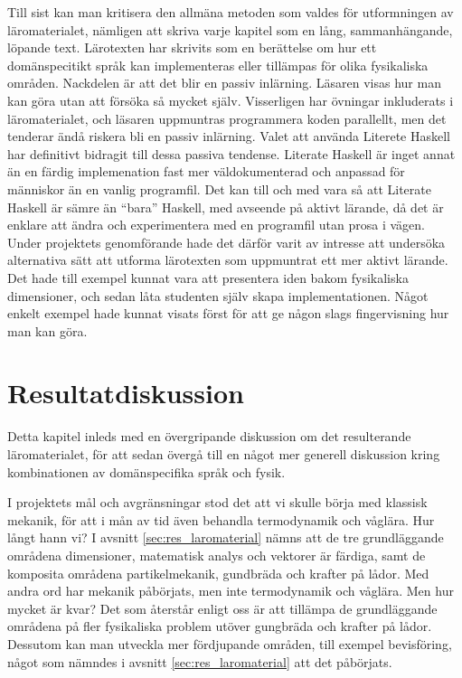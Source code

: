 \begin{binge}
Till sist kan man kritisera den allmäna metoden som valdes för utformningen av läromaterialet, nämligen att skriva varje kapitel som en lång, sammanhängande, löpande text. Lärotexten har skrivits som en berättelse om hur ett domänspecitikt språk kan implementeras eller tillämpas för olika fysikaliska områden. Nackdelen är att det blir en passiv inlärning. Läsaren visas hur man kan göra utan att försöka så mycket själv. Visserligen har övningar inkluderats i läromaterialet, och läsaren uppmuntras programmera koden parallellt, men det tenderar ändå riskera bli en passiv inlärning.  Valet att använda Literete Haskell har definitivt bidragit till dessa passiva tendense. Literate Haskell är inget annat än en färdig implemenation fast mer väldokumenterad och anpassad för människor än en vanlig programfil. Det kan till och med vara så att Literate Haskell är sämre än ``bara'' Haskell, med avseende på aktivt lärande, då det är enklare att ändra och experimentera med en programfil utan prosa i vägen. Under projektets genomförande hade det därför varit av intresse att undersöka alternativa sätt att utforma lärotexten som uppmuntrat ett mer aktivt lärande. Det hade till exempel kunnat vara att presentera iden bakom fysikaliska dimensioner, och sedan låta studenten själv skapa implementationen. Något enkelt exempel hade kunnat visats först för att ge någon slags fingervisning hur man kan göra.

\section{Resultatdiskussion}

Detta kapitel inleds med en övergripande diskussion om det resulterande läromaterialet, för att sedan övergå till en något mer generell diskussion kring kombinationen av domänspecifika språk och fysik.

I projektets mål och avgränsningar stod det att vi skulle börja med klassisk mekanik, för att i mån av tid även behandla termodynamik och våglära. Hur långt hann vi? I avsnitt \ref{sec:res_laromaterial} nämns att de tre grundläggande områdena dimensioner, matematisk analys och vektorer är färdiga, samt de komposita områdena partikelmekanik, gundbräda och krafter på lådor. Med andra ord har mekanik påbörjats, men inte termodynamik och våglära. Men hur mycket är kvar? Det som återstår enligt oss är att tillämpa de grundläggande områdena på fler fysikaliska problem utöver gungbräda och krafter på lådor. Dessutom kan man utveckla mer fördjupande områden, till exempel bevisföring, något som nämndes i avsnitt \ref{sec:res_laromaterial} att det påbörjats.










\end{binge}
